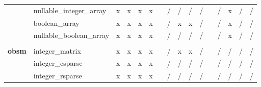 \documentclass{article}
\begin{document}
\begin{longtable}{llllllllllllllll}
                & nullable\_integer\_array  & \cellcolor[HTML]{B7E1CD}x & \cellcolor[HTML]{B7E1CD}x & \cellcolor[HTML]{B7E1CD}x & \cellcolor[HTML]{B7E1CD}x &  & \cellcolor[HTML]{F4CCCC}/ & \cellcolor[HTML]{F4CCCC}/ & \cellcolor[HTML]{F4CCCC}/ & \cellcolor[HTML]{F4CCCC}/ &  & \cellcolor[HTML]{F4CCCC}/ & \cellcolor[HTML]{B7E1CD}x & \cellcolor[HTML]{F4CCCC}/ & \cellcolor[HTML]{F4CCCC}/ \\
                & boolean\_array            & \cellcolor[HTML]{B7E1CD}x & \cellcolor[HTML]{B7E1CD}x & \cellcolor[HTML]{B7E1CD}x & \cellcolor[HTML]{B7E1CD}x &  & \cellcolor[HTML]{F4CCCC}/ & \cellcolor[HTML]{B7E1CD}x & \cellcolor[HTML]{B7E1CD}x & \cellcolor[HTML]{F4CCCC}/ &  & \cellcolor[HTML]{F4CCCC}/ & \cellcolor[HTML]{B7E1CD}x & \cellcolor[HTML]{F4CCCC}/ & \cellcolor[HTML]{F4CCCC}/ \\
                & nullable\_boolean\_array  & \cellcolor[HTML]{B7E1CD}x & \cellcolor[HTML]{B7E1CD}x & \cellcolor[HTML]{B7E1CD}x & \cellcolor[HTML]{B7E1CD}x &  & \cellcolor[HTML]{F4CCCC}/ & \cellcolor[HTML]{F4CCCC}/ & \cellcolor[HTML]{F4CCCC}/ & \cellcolor[HTML]{F4CCCC}/ &  & \cellcolor[HTML]{F4CCCC}/ & \cellcolor[HTML]{B7E1CD}x & \cellcolor[HTML]{F4CCCC}/ & \cellcolor[HTML]{F4CCCC}/ \\
                &                           &                           &                           &                           &                           &  &                           &                           &                           &                           &  &                           &                           &                           &                           \\
\textbf{obsm}   & integer\_matrix           & \cellcolor[HTML]{B7E1CD}x & \cellcolor[HTML]{B7E1CD}x & \cellcolor[HTML]{B7E1CD}x & \cellcolor[HTML]{B7E1CD}x &  & \cellcolor[HTML]{F4CCCC}/ & \cellcolor[HTML]{B7E1CD}x & \cellcolor[HTML]{B7E1CD}x & \cellcolor[HTML]{F4CCCC}/ &  & \cellcolor[HTML]{F4CCCC}/ & \cellcolor[HTML]{F4CCCC}/ & \cellcolor[HTML]{F4CCCC}/ & \cellcolor[HTML]{F4CCCC}/ \\
                & integer\_csparse          & \cellcolor[HTML]{B7E1CD}x & \cellcolor[HTML]{B7E1CD}x & \cellcolor[HTML]{B7E1CD}x & \cellcolor[HTML]{B7E1CD}x &  & \cellcolor[HTML]{F4CCCC}/ & \cellcolor[HTML]{F4CCCC}/ & \cellcolor[HTML]{F4CCCC}/ & \cellcolor[HTML]{F4CCCC}/ &  & \cellcolor[HTML]{F4CCCC}/ & \cellcolor[HTML]{F4CCCC}/ & \cellcolor[HTML]{F4CCCC}/ & \cellcolor[HTML]{F4CCCC}/ \\
                & integer\_rsparse          & \cellcolor[HTML]{B7E1CD}x & \cellcolor[HTML]{B7E1CD}x & \cellcolor[HTML]{B7E1CD}x & \cellcolor[HTML]{B7E1CD}x &  & \cellcolor[HTML]{F4CCCC}/ & \cellcolor[HTML]{F4CCCC}/ & \cellcolor[HTML]{F4CCCC}/ & \cellcolor[HTML]{F4CCCC}/ &  & \cellcolor[HTML]{F4CCCC}/ & \cellcolor[HTML]{F4CCCC}/ & \cellcolor[HTML]{F4CCCC}/ & \cellcolor[HTML]{F4CCCC}/ \\

\end{longtable}
\end{document}
